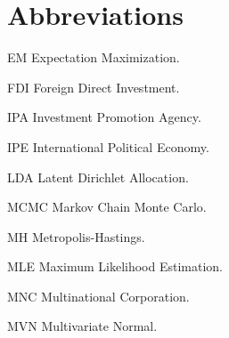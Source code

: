 \abbreviations





\section*{Abbreviations}

\begin{symbollist}
  \item[EM] Expectation Maximization.
	\item[FDI] Foreign Direct Investment.
  \item[IPA] Investment Promotion Agency.
  \item[IPE] International Political Economy.
    \item[LDA] Latent Dirichlet Allocation.
	\item[MCMC] Markov Chain Monte Carlo.
  \item[MH] Metropolis-Hastings.
	\item[MLE] Maximum Likelihood Estimation.
  \item[MNC] Multinational Corporation.
  \item[MVN] Multivariate Normal.
\end{symbollist}
